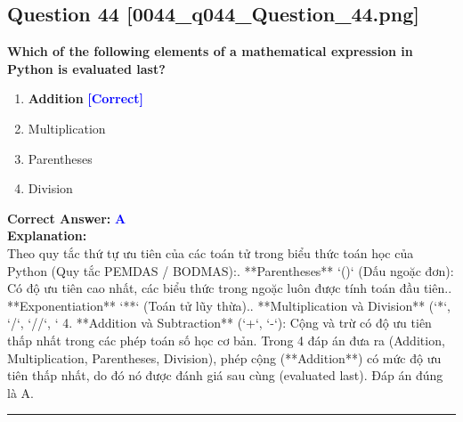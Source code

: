 \documentclass[11pt,a4paper]{article}
\begin{document}
\begin{minipage}{\textwidth}
\subsection*{Question 44 \quad \footnotesize{[0044_q044_Question_44.png]}}
\noindent \textbf{Which of the following elements of a mathematical expression in Python is evaluated last?}

\begin{enumerate}[label=\Alph*.]
    \item \textbf{Addition} \hfill \textcolor{blue}{\textbf{[Correct]}}
    \item Multiplication
    \item Parentheses
    \item Division
\end{enumerate}

\noindent \textbf{Correct Answer:} \textcolor{blue}{\textbf{A}} \\[4pt]
\noindent \textbf{Explanation:}\\
Theo quy tắc thứ tự ưu tiên của các toán tử trong biểu thức toán học của Python (Quy tắc PEMDAS / BODMAS):. **Parentheses** `()` (Dấu ngoặc đơn): Có độ ưu tiên cao nhất, các biểu thức trong ngoặc luôn được tính toán đầu tiên.. **Exponentiation** `**` (Toán tử lũy thừa).. **Multiplication và Division** (`*`, `/`, `//`, `%
4. **Addition và Subtraction** (`+`, `-`): Cộng và trừ có độ ưu tiên thấp nhất trong các phép toán số học cơ bản.\newline
\newline
Trong 4 đáp án đưa ra (Addition, Multiplication, Parentheses, Division), phép cộng (**Addition**) có mức độ ưu tiên thấp nhất, do đó nó được đánh giá sau cùng (evaluated last). Đáp án đúng là A.
\end{minipage}
\vspace{0.8cm}
\hrule
\vspace{0.5cm}
\end{document}
